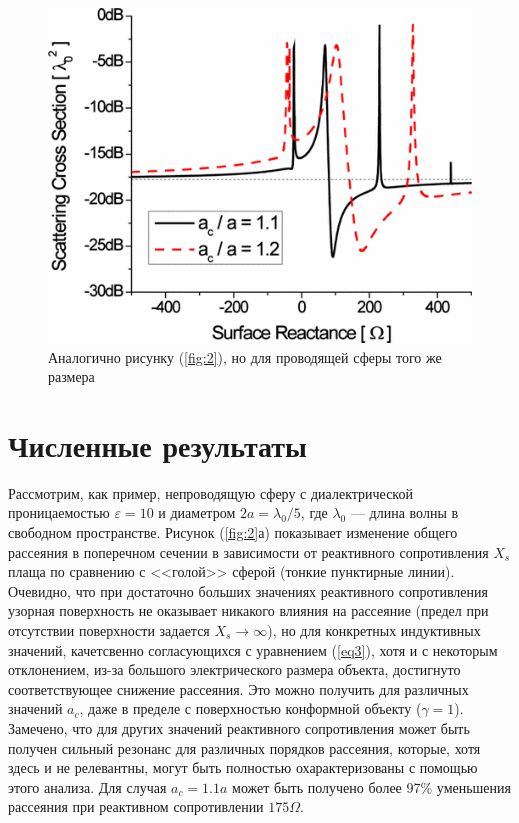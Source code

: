 \documentclass[12pt,a4paper]{article}
\begin{document}
\begin{figure}[t]
  \centering
  \includegraphics[height=0.15\paperheight, width=0.4\paperwidth]{4.png}
  \caption{Аналогично рисунку (\ref{fig:2}), но для проводящей сферы того же размера}
  \label{fig:4}
\end{figure}

\section{Численные результаты}
Рассмотрим, как пример, непроводящую сферу с диалектрической проницаемостью $\varepsilon=10$ 
и диаметром $2a=\lambda_0/5$, где $\lambda_0$ --- длина волны в свободном пространстве. 
Рисунок (\ref{fig:2}а) показывает изменение общего рассеяния в поперечном сечении в 
зависимости от реактивного сопротивления $X_s$ плаща по сравнению с <<голой>> сферой
(тонкие пунктирные линии). Очевидно, что при достаточно больших значениях реактивного 
сопротивления узорная поверхность не оказывает никакого влияния на рассеяние (предел при
отсутствии поверхности задается $X_s \to \infty$), но для конкретных индуктивных значений,
качетсвенно согласующихся с уравнением (\ref{eq3}), хотя и с некоторым отклонением, из-за
большого электрического размера объекта, достигнуто соответствующее снижение рассеяния.
Это можно получить для различных значений $a_c$, даже в пределе с поверхностью конформной
объекту ($\gamma=1$). Замечено, что для других значений реактивного сопротивления может
быть получен сильный резонанс для различных порядков рассеяния, которые, хотя здесь и не
релевантны, могут быть полностью охарактеризованы с помощью этого анализа. Для случая
$a_c=1.1a$ может быть получено более 97\% уменьшения рассеяния при реактивном сопротивлении
$175\Omega$.
\end{document}
